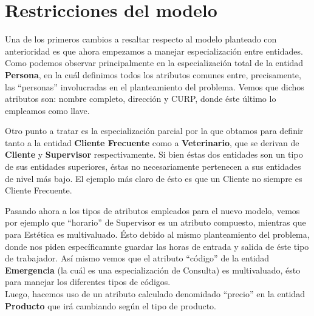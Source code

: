 \documentclass{article}
\begin{document}
\section*{Restricciones del modelo}

Una de los primeros cambios a resaltar respecto al modelo planteado con anterioridad es que ahora empezamos a manejar 
especialización entre entidades. Como podemos observar principalmente en la especialización total de la entidad \textbf{Persona}, 
en la cuál definimos todos los atributos comunes entre, precisamente, las ``personas'' involucradas en el planteamiento del
problema. Vemos que dichos atributos son: nombre completo, dirección y CURP, donde éste último lo empleamos como llave.

Otro punto a tratar es la especialización parcial por la que obtamos para definir tanto a la entidad \textbf{Cliente Frecuente} 
como a \textbf{Veterinario}, que se derivan de \textbf{Cliente} y \textbf{Supervisor} respectivamente. Si bien éstas dos entidades 
son un tipo de sus entidades superiores, éstas no necesariamente pertenecen a sus entidades de nivel más bajo. El ejemplo más claro 
de ésto es que un Cliente no siempre es Cliente Frecuente.

Pasando ahora a los tipos de atributos empleados para el nuevo modelo, vemos por ejemplo que ``horario'' de Supervisor es un atributo 
compuesto, mientras que para Estética es multivaluado. Ésto debido al mismo planteamiento del problema, donde nos piden específicamnte 
guardar las horas de entrada y salida de éste tipo de trabajador.
Así mismo vemos que el atributo ``código'' de la entidad \textbf{Emergencia} (la cuál es una especialización de Consulta) es multivaluado,
ésto para manejar los diferentes tipos de códigos.\\ 
Luego, hacemos uso de un atributo calculado denomidado ``precio'' en la entidad \textbf{Producto} que irá cambiando según el tipo de 
producto.
\end{document}
